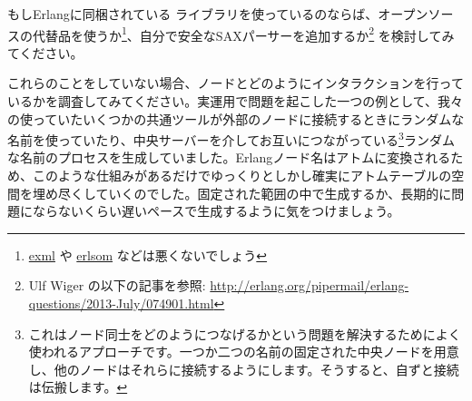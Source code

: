 もしErlangに同梱されている  ライブラリを使っているのならば、オープンソースの代替品を使うか\footnote{\href{https://github.com/paulgray/exml}{exml} や \href{https://github.com/willemdj/erlsom}{erlsom} などは悪くないでしょう}、自分で安全なSAXパーサーを追加するか\footnote{Ulf Wiger の以下の記事を参照:  \href{http://erlang.org/pipermail/erlang-questions/2013-July/074901.html}{http://erlang.org/pipermail/erlang-questions/2013-July/074901.html}} を検討してみてください。

これらのことをしていない場合、ノードとどのようにインタラクションを行っているかを調査してみてください。実運用で問題を起こした一つの例として、我々の使っていたいくつかの共通ツールが外部のノードに接続するときにランダムな名前を使っていたり、中央サーバーを介してお互いにつながっている\footnote{これはノード同士をどのようにつなげるかという問題を解決するためによく使われるアプローチです。一つか二つの名前の固定された中央ノードを用意し、他のノードはそれらに接続するようにします。そうすると、自ずと接続は伝搬します。}ランダムな名前のプロセスを生成していました。Erlangノード名はアトムに変換されるため、このような仕組みがあるだけでゆっくりとしかし確実にアトムテーブルの空間を埋め尽くしていくのでした。固定された範囲の中で生成するか、長期的に問題にならないくらい遅いペースで生成するように気をつけましょう。

